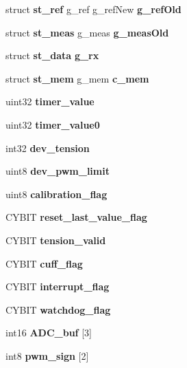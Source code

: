 \begin{DoxyCompactItemize}
\item 
\mbox{\label{globals_8h_a158d26b6d15050b37d8039881d75e0dc}} 
struct \textbf{ st\+\_\+ref} g\+\_\+ref g\+\_\+ref\+New {\bfseries g\+\_\+ref\+Old}
\item 
\mbox{\label{globals_8h_a47c3980e6bddec492ca4315e36602ba0}} 
struct \textbf{ st\+\_\+meas} g\+\_\+meas {\bfseries g\+\_\+meas\+Old}
\item 
\mbox{\label{globals_8h_aa963ce8fafc11e104eb7ee22982d0345}} 
struct \textbf{ st\+\_\+data} {\bfseries g\+\_\+rx}
\item 
\mbox{\label{globals_8h_a44c3cbd8e234e0816f0334e29646a800}} 
struct \textbf{ st\+\_\+mem} g\+\_\+mem {\bfseries c\+\_\+mem}
\item 
\mbox{\label{globals_8h_ad47cd0e4d0fcf5739a88e52e949a8084}} 
uint32 {\bfseries timer\+\_\+value}
\item 
\mbox{\label{globals_8h_a9bab7f1b1cf2ba38d5968eee42644c32}} 
uint32 {\bfseries timer\+\_\+value0}
\item 
\mbox{\label{globals_8h_a53a494e9edc739a4f7c884778d1a93b1}} 
int32 {\bfseries dev\+\_\+tension}
\item 
\mbox{\label{globals_8h_a21f4f67e4203dea0b9956589eaa6cef3}} 
uint8 {\bfseries dev\+\_\+pwm\+\_\+limit}
\item 
\mbox{\label{globals_8h_afa36d7a54495dfdb796684539bf041a5}} 
uint8 {\bfseries calibration\+\_\+flag}
\item 
\mbox{\label{globals_8h_aa89a782cfe75ce7970236babd308fe69}} 
C\+Y\+B\+IT {\bfseries reset\+\_\+last\+\_\+value\+\_\+flag}
\item 
\mbox{\label{globals_8h_ac42fa606610c2600210d9b7b2c1d0882}} 
C\+Y\+B\+IT {\bfseries tension\+\_\+valid}
\item 
\mbox{\label{globals_8h_aa5f34e5d7cb5b1196d8e8ace4beb508e}} 
C\+Y\+B\+IT {\bfseries cuff\+\_\+flag}
\item 
\mbox{\label{globals_8h_a1e6fda88dfdabc63859f8907eb702920}} 
C\+Y\+B\+IT {\bfseries interrupt\+\_\+flag}
\item 
\mbox{\label{globals_8h_a156a860c465529ff2f515725ab816a58}} 
C\+Y\+B\+IT {\bfseries watchdog\+\_\+flag}
\item 
\mbox{\label{globals_8h_aed6b2ae513eb1fdb1dcfb2e8191dbfdd}} 
int16 {\bfseries A\+D\+C\+\_\+buf} [3]
\item 
\mbox{\label{globals_8h_a581fe1be8b8832dd9b5bc74d6cd8cfbd}} 
int8 {\bfseries pwm\+\_\+sign} [2]
\end{DoxyCompactItemize}


